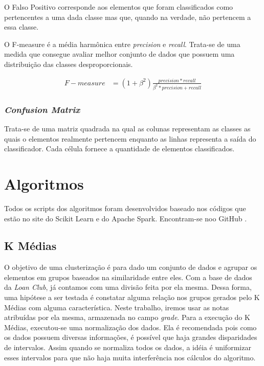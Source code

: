 O Falso Positivo corresponde aos elementos que foram classificados como pertencentes a uma dada classe mas que, quando na verdade, não pertencem a essa classe.

O F-measure é a média harmônica entre \emph{precision} e \emph{recall}. Trata-se de uma medida que consegue avaliar melhor conjunto de dados que possuem uma distribuição das classes desproporcionais. 

\begin{equation}
  \label{eq:precision}
  \begin{aligned}
F-measure &= (1 + \beta^{2})\frac{precision*recall}{\beta^{2}*precision + recall} 
  \end{aligned}  
\end{equation}

\subsubsection{\emph{Confusion Matrix}}
Trata-se de uma matriz quadrada na qual 
as colunas representam as classes as quais o elementos realmente pertencem enquanto as linhas representa a saída do classificador. Cada célula fornece a quantidade de elementos classificados.

\section{Algoritmos}

Todos os scripts dos algoritmos foram desenvolvidos baseado nos códigos que estão no site do Scikit Learn e do Apache Spark. Encontram-se noo GitHub \cite{GIT}.

\subsection{K Médias}

O objetivo de uma clusterização é para dado um conjunto de dados e agrupar os elementos em grupos baseados na similaridade entre eles. Com a base de dados da \emph{Loan Club}, já contamos com uma divisão feita por ela mesma. Dessa forma, uma hipótese a ser testada é constatar alguma relação nos grupos gerados pelo K Médias com alguma característica. Neste trabalho, iremos usar as notas atribuídas por ela mesma, armazenada no campo \emph{grade}. Para a execução do K Médias, executou-se uma normalização dos dados. Ela é recomendada pois como os dados possuem diversas informações, é possível que haja grandes disparidades de intervalos. Assim quando se normaliza todos os dados, a idéia é uniformizar esses intervalos para que não haja muita interferência nos cálculos do algoritmo. 

